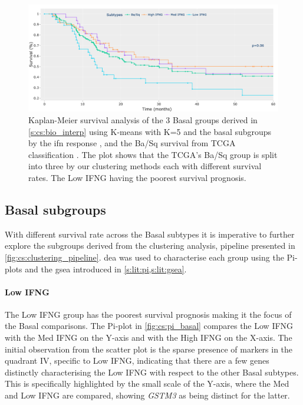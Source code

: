 \begin{figure}[!htb]    
    \centering
    \includegraphics[width=1.0\textwidth,keepaspectratio]{Sections/ClusteringAnalysis/Resources/discussion/survival_basal.png}
    \centering
    \caption{Kaplan-Meier survival analysis of the 3 Basal groups derived in \cref{s:cs:bio_interp} using K-means with K=5 and the basal subgroups by the \acrshort{ifn} response \citet{Baker2022-bj}, and the Ba/Sq survival from TCGA classification \citet{Robertson2017-mg}. The plot shows that the TCGA's Ba/Sq group is split into three by our clustering methods each with different survival rates. The Low IFNG having the poorest survival prognosis.}
    \label{fig:cs:basal_survival}
\end{figure}

\subsection{Basal subgroups} \label{s:cs:basal_interp}

With different survival rate across the Basal subtypes it is imperative to further explore the subgroups derived from the clustering analysis, pipeline presented in \cref{fig:cs:clustering_pipeline}. \acrfull{dea} was used to characterise each group using the Pi-plots and the \acrfull{gsea} introduced in \cref{s:lit:pi,s:lit:gsea}. 

\paragraph*{Low IFNG}

The Low IFNG group has the poorest survival prognosis making it the focus of the Basal comparisons. The Pi-plot in \cref{fig:cs:pi_basal} compares the Low IFNG with the Med IFNG on the Y-axis and with the High IFNG on the X-axis. The initial observation from the scatter plot is the sparse presence of markers in the quadrant IV, specific to Low IFNG, indicating that there are a few genes distinctly characterising the Low IFNG with respect to the other Basal subtypes. This is specifically highlighted by the small scale of the Y-axis, where the Med and Low IFNG are compared, showing \textit{GSTM3} as being distinct for the latter.

